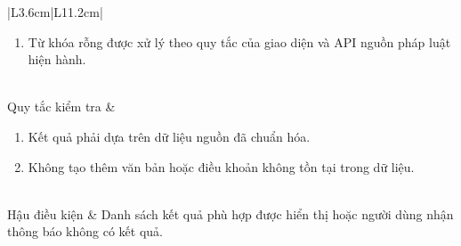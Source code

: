 \documentclass[12pt,a4paper,oneside]{report}
\begin{document}
{\begin{longtable}{|L{3.6cm}|L{11.2cm}|}
\begin{enumerate}[leftmargin=*,nosep]
                            \item Từ khóa rỗng được xử lý theo quy tắc của giao diện và API nguồn pháp luật hiện hành.
                          \end{enumerate} \\
    \hline
    Quy tắc kiểm tra    & \begin{enumerate}[leftmargin=*,nosep]
                            \item Kết quả phải dựa trên dữ liệu nguồn đã chuẩn hóa.
                            \item Không tạo thêm văn bản hoặc điều khoản không tồn tại trong dữ liệu.
                          \end{enumerate}                  \\
    \hline
    Hậu điều kiện       & Danh sách kết quả phù hợp được hiển thị hoặc người dùng nhận thông báo không có kết quả.  \\
    \hline
  \end{longtable}
}
\end{document}
